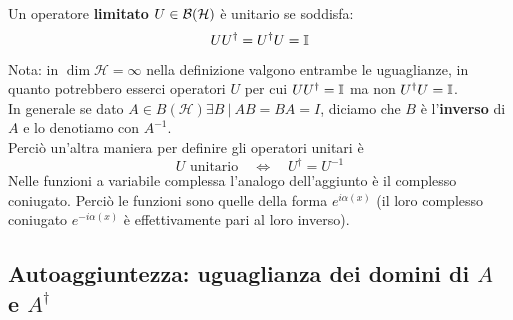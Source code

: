 \begin{dfn}  Un operatore \textbf{limitato} $U\in \mathcal{B}(\mathcal{H})$ è unitario se soddisfa:
\begin{equation}
UU^\dag=U^\dag U=\mathbb{I}
\label{eqn:unitario}
\end{equation}
\end{dfn}
Nota: in $\dim{\mathcal{H}=\infty}$ nella definizione valgono entrambe le uguaglianze, in quanto potrebbero esserci operatori $U$ per cui $U U^\dag = \mathbb{I}$ ma non $U^\dag U = \mathbb{I}$. \\

In generale se dato $A\in B\left(\mathcal{H}\right) \exists B\>|\> AB=BA=I$, diciamo che $B$ è l'\textbf{inverso} di $A$ e lo denotiamo con $A^{-1}$. \\
Perciò un'altra maniera per definire gli operatori unitari è
\[
U \text{ unitario} \quad \Leftrightarrow \quad U^\dag=U^{-1}
\]
Nelle funzioni a variabile complessa l'analogo dell'aggiunto è il complesso coniugato. Perciò le funzioni  sono quelle della forma $e^{i\alpha\left(x\right)}$ (il loro complesso coniugato $e^{-i\alpha(x)}$ è effettivamente pari al loro inverso). \\

\subsection{Autoaggiuntezza: uguaglianza dei domini di $A$ e $A^\dag$}

